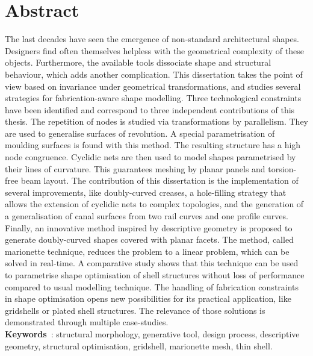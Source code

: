 
\cleardoublepage
\chapter*{Abstract}
The last decades have seen the emergence of non-standard architectural shapes. Designers find often themselves helpless with the geometrical complexity of these objects. Furthermore, the available tools dissociate shape and structural behaviour, which adds another complication. This dissertation takes the point of view based on invariance under geometrical transformations, and studies several strategies for fabrication-aware shape modelling. Three technological constraints have been identified and correspond to three independent contributions of this thesis. The repetition of nodes is studied via transformations by parallelism. They are used to generalise surfaces of revolution. A special parametrisation of moulding surfaces is found with this method. The resulting structure has a high node congruence. Cyclidic nets are then used to model shapes parametrised by their lines of curvature. This guarantees meshing by planar panels and torsion-free beam layout. The contribution of this dissertation is the implementation of several improvements, like doubly-curved creases, a hole-filling strategy that allows the extension of cyclidic nets to complex topologies, and the generation of a generalisation of canal surfaces from two rail curves and one profile curves. Finally, an innovative method inspired by descriptive geometry is proposed to generate doubly-curved shapes covered with planar facets. The method, called marionette technique, reduces the problem to a linear problem, which can be solved in real-time. A comparative study shows that this technique can be used to parametrise shape optimisation of shell structures without loss of performance compared to usual modelling technique. The handling of fabrication constraints in shape optimisation opens new possibilities for its practical application, like gridshells or plated shell structures. The relevance of those solutions is demonstrated through multiple case-studies.
\vspace{12pt}\\
\textbf{Keywords}~: structural morphology, generative tool, design process, descriptive geometry, structural optimisation, gridshell, marionette mesh, thin shell.

